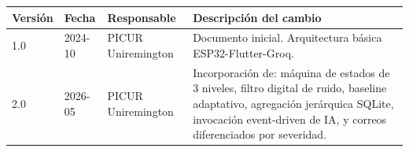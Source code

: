 \documentclass[12pt,a4paper]{article}
\begin{document}
\begin{center}
\begin{tabularx}{0.9\textwidth}{lllX}
    \toprule
    \textbf{Versión} & \textbf{Fecha} & \textbf{Responsable} & \textbf{Descripción del cambio} \\
    \midrule
    1.0 & 2024-10 & PICUR Uniremington & Documento inicial. Arquitectura básica ESP32-Flutter-Groq. \\
    2.0 & 2026-05 & PICUR Uniremington &
        Incorporación de: máquina de estados de 3 niveles, filtro digital de ruido, baseline adaptativo, agregación jerárquica SQLite, invocación event-driven de IA, y correos diferenciados por severidad. \\
    \bottomrule
\end{tabularx}
\end{center}
\end{document}
